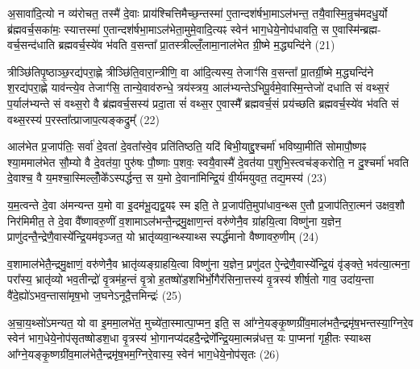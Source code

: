 {\anuvakamend[{स॒ङ्ग्रा॒मे तेनाल॑मभिमाति॒घ्ने ल॒लामं॑ प्राशृ॒ङ्गमैनं॒ पञ्च॑दश च।3।}]}

अ॒सावा॑दि॒त्यो न व्य॑रोचत॒ तस्मै॑ दे॒वाः प्राय॑श्चित्तिमैच्छ॒न्तस्मा॑ ए॒तान्दश॑र्\mbox{}षभा॒मा\-ऽल॑भन्त॒ तयै॒वास्मि॒न्रुच॑मदधु॒र्यो ब्र॑ह्मवर्च॒सका॑मः॒ स्यात्तस्मा॑ ए॒तान्दश॑र्\mbox{}षभा॒मा\-ऽल॑भेता॒मुमे॒वादि॒त्यꣴ स्वेन॑ भाग॒धेये॒नोप॑धावति॒ स ए॒वास्मि॑न्ब्रह्म- वर्च॒सन्द॑धाति ब्रह्मवर्च॒स्ये॑व भ॑वति व॒सन्ता᳚ प्रा॒तस्त्रील्लँ॒लामा॒नाल॑भेत ग्री॒ष्मे म॒द्ध्यन्दि॑ने (21)

त्रीञ्छि॑तिपृ॒ष्ठाञ्छ॒रद्य॑परा॒ह्णे त्रीञ्छि॑ति॒वारा॒न्त्रीणि॒ वा आ॑दि॒त्यस्य॒ तेजाꣳ॑सि व॒सन्ता᳚ प्रा॒तर्ग्री॒ष्मे म॒द्ध्यन्दि॑ने श॒रद्य॑परा॒ह्णे याव॑न्त्ये॒व तेजाꣳ॑सि॒ तान्ये॒वाव॑रुन्धे॒ त्रय॑स्त्रय॒ आल॑भ्यन्ते\-ऽभिपू॒र्वमे॒वास्मि॒न्तेजो॑ दधाति सं वथ्स॒रं प॒र्याल॑भ्यन्ते सं वथ्स॒रो वै ब्र॑ह्मवर्च॒सस्य॑ प्रदा॒ता सं॑ वथ्स॒र ए॒वास्मै᳚ ब्रह्मवर्च॒सं प्रय॑च्छति ब्रह्मवर्च॒स्ये॑व भ॑वति सं वथ्स॒रस्य॑ प॒रस्ता᳚त्प्राजाप॒त्यङ्कद्रुम्᳚ (22)

आल॑भेत प्र॒जाप॑तिः॒ सर्वा॑ दे॒वता॑ दे॒वता᳚स्वे॒व प्रति॑तिष्ठति॒ यदि॑ बिभी॒याद्दु॒श्चर्मा॑ भविष्या॒मीति॑ सोमापौ॒ष्णꣴ श्या॒ममाल॑भेत सौ॒म्यो वै दे॒वत॑या॒ पुरु॑षः पौ॒ष्णाः प॒शवः॒ स्वयै॒वास्मै॑ दे॒वत॑या प॒शुभि॒स्त्वच॑ङ्करोति॒ न दु॒श्चर्मा॑ भवति दे॒वाश्च॒ वै य॒मश्चा॒स्मिल्लोँ॒के᳚\-ऽस्पर्द्धन्त॒ स य॒मो दे॒वाना॑मिन्द्रि॒यं वी॒र्य॑मयुवत॒ तद्य॒मस्य॑ (23)

य॒म॒त्वन्ते दे॒वा अ॑मन्यन्त य॒मो वा इ॒दम॑भू॒द्यद्व॒यꣴ स्म इति॒ ते प्र॒जाप॑ति॒मुपा॑धाव॒न्थ्स ए॒तौ प्र॒जाप॑तिरा॒त्मन॑ उक्षव॒शौ निर॑मिमीत॒ ते दे॒वा वै᳚ष्णावरु॒णीं व॒शामा\-ऽल॑भन्तै॒न्द्रमु॒क्षाण॒न्तं वरु॑णेनै॒व ग्रा॑हयि॒त्वा विष्णु॑ना य॒ज्ञेन॒ प्राणु॑दन्तै॒न्द्रेणै॒वास्ये᳚न्द्रि॒यम॑वृञ्जत॒ यो भ्रातृ॑व्यवा॒न्थ्स्याथ्स स्पर्द्ध॑मानो वैष्णावरु॒णीम् (24)

व॒शामाल॑भेतै॒न्द्रमु॒क्षाणं॒ वरु॑णेनै॒व भ्रातृ॑व्यङ्ग्राहयि॒त्वा विष्णु॑ना य॒ज्ञेन॒ प्रणु॑दत ऐ॒न्द्रेणै॒वास्ये᳚न्द्रि॒यं वृ॑ङ्क्ते॒ भव॑त्या॒त्मना॒ परा᳚स्य॒ भ्रातृ॑व्यो भव॒तीन्द्रो॑ वृ॒त्रम॑ह॒न्तं वृ॒त्रो ह॒तष्षो॑ड॒शभि॑र्भो॒गैर॑सिना॒त्तस्य॑ वृ॒त्रस्य॑ शीर्\mbox{}ष॒तो गाव॒ उदा॑य॒न्ता वै॑दे॒ह्यो॑\-ऽभव॒न्तासा॑मृष॒भो ज॒घने\-ऽनूदै॒त्तमिन्द्रः॑ (25)

अ॒चा॒य॒थ्सो॑\-ऽमन्यत॒ यो वा इ॒ममा॒लभे॑त॒ मुच्ये॑ता॒स्मात्पा॒प्मन॒ इति॒ स आ᳚ग्ने॒यङ्कृ॒ष्णग्री॑व॒माल॑भतै॒न्द्रमृ॑ष॒भन्तस्या॒ग्निरे॒व स्वेन॑ भाग॒धेये॒नोप॑सृतष्षोडश॒धा वृ॒त्रस्य॑ भो॒गानप्य॑दहदै॒न्द्रेणे᳚न्द्रि॒यमा॒त्मन्न॑धत्त॒ यः पा॒प्मना॑ गृही॒तः स्याथ्स आ᳚ग्ने॒यङ्कृ॒ष्णग्री॑व॒माल॑भेतै॒न्द्रमृ॑ष॒भम॒ग्निरे॒वास्य॒ स्वेन॑ भाग॒धेये॒नोप॑सृतः (26)

